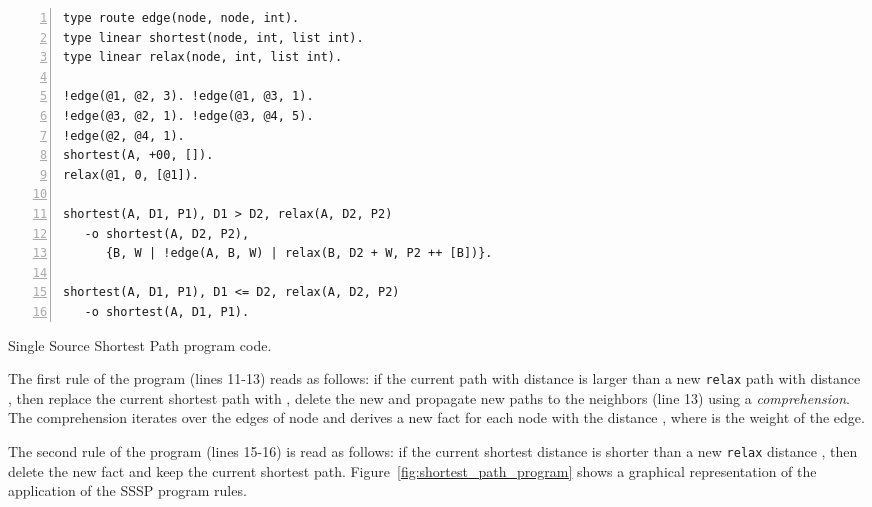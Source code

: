 \begin{topfig}
\begin{Verbatim}[numbers=left,xleftmargin=\codemargin,fontsize=\scriptsize]
type route edge(node, node, int).
type linear shortest(node, int, list int).
type linear relax(node, int, list int).

!edge(@1, @2, 3). !edge(@1, @3, 1).
!edge(@3, @2, 1). !edge(@3, @4, 5).
!edge(@2, @4, 1).
shortest(A, +00, []).
relax(@1, 0, [@1]).

shortest(A, D1, P1), D1 > D2, relax(A, D2, P2)
   -o shortest(A, D2, P2),
      {B, W | !edge(A, B, W) | relax(B, D2 + W, P2 ++ [B])}.

shortest(A, D1, P1), D1 <= D2, relax(A, D2, P2)
   -o shortest(A, D1, P1).
\end{Verbatim}
\caption{Single Source Shortest Path program code.}
\label{code:shortest_path_program}
\end{topfig}

The first rule of the program (lines 11-13) reads as follows: if the current
 path  with distance  is larger than a new
\texttt{relax} path with distance , then replace the current shortest
path with , delete the new  and propagate new paths to
the neighbors (line 13) using a \emph{comprehension}.  The comprehension
iterates over the edges of node  and derives a new  fact for
each node  with the distance , where  is the weight
of the edge.

The second rule of the program (lines 15-16) is read as follows: if the current
shortest distance  is shorter than a new \texttt{relax} distance
, then delete the new  fact and keep the current shortest
path. Figure~\ref{fig:shortest_path_program} shows a graphical representation of
the application of the SSSP program rules.


